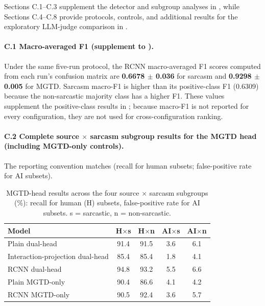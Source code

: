 Sections C.1--C.3 supplement the detector and subgroup analyses in , while Sections C.4--C.8 provide protocols, controls, and additional results for the exploratory LLM-judge comparison in .

\label{app:c1}\paragraph{C.1 Macro-averaged F1 (supplement to ).} Under the same five-run protocol, the RCNN macro-averaged F1 scores computed from each run's confusion matrix are \textbf{0.6678 $\pm$ 0.036} for sarcasm and \textbf{0.9298 $\pm$ 0.005} for MGTD. Sarcasm macro-F1 is higher than its positive-class F1 (0.6309) because the non-sarcastic majority class has a higher F1. These values supplement the positive-class results in ; because macro-F1 is not reported for every configuration, they are not used for cross-configuration ranking.

\paragraph{C.2 Complete source $\times$ sarcasm subgroup results for the MGTD head (including MGTD-only controls).} The reporting convention matches  (recall for human subsets; false-positive rate for AI subsets).

\begin{table}[h]
  \centering
  \small
  \setlength{\tabcolsep}{2.5pt}
  \begin{tabular}{@{}p{2.35cm}cccc@{}}
    \toprule
    \textbf{Model} & \textbf{H$\times$s} & \textbf{H$\times$n} & \textbf{AI$\times$s} & \textbf{AI$\times$n} \\
    \midrule
    Plain dual-head & 91.4 & 91.5 & 3.6 & 6.1 \\
    Interaction-projection dual-head & 85.4 & 85.4 & 1.8 & 4.1 \\
    RCNN dual-head & 94.8 & 93.2 & 5.5 & 6.6 \\
    Plain MGTD-only & 90.4 & 86.6 & 4.1 & 4.2 \\
    RCNN MGTD-only & 90.5 & 92.4 & 3.6 & 5.7 \\
    \bottomrule
  \end{tabular}
  \caption{MGTD-head results across the four source $\times$ sarcasm subgroups (\%): recall for human (H) subsets, false-positive rate for AI subsets. s = sarcastic, n = non-sarcastic.}
  \label{tab:auth-quadrant}
\end{table}

